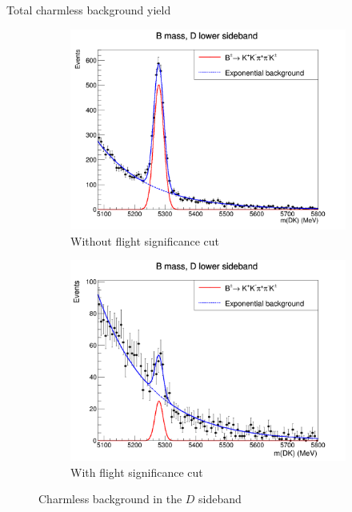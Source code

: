 \documentclass{beamer}
\begin{document}
\begin{frame}{Total charmless background yield}
  \begin{figure}
    \centering
    \vspace{-0.2cm}
    \begin{subfigure}{0.5\textwidth}
      \includegraphics[width = 1.0\textwidth]{B2DKLower_PlusMinus_AllBins_Charmless.png}
      \caption{Without flight significance cut}
    \end{subfigure}%
    \begin{subfigure}{0.5\textwidth}
      \includegraphics[width = 1.0\textwidth]{B2DKLower_PlusMinus_AllBinsFDCut_Charmless.png}
      \caption{With flight significance cut}
    \end{subfigure}
    \caption{Charmless background in the $D$ sideband}
  \end{figure}
\end{frame}
\end{document}
